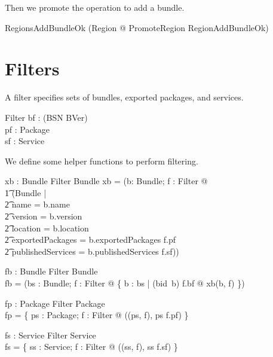 \documentclass[a4paper,9pt]{article}
\begin{document}
Then we promote the operation to add a bundle.
\begin{zed}
  RegionsAddBundleOk  (\exists \Delta Region @ PromoteRegion \land RegionAddBundleOk) \\
\end{zed}

\clearpage
\section{Filters}
\label{cha:filters}

A filter specifies sets of bundles, exported packages, and services.
\begin{schema}{Filter}
  bf : \power (BSN \cross BVer) \\
  pf : \power Package \\
  sf : \power Service \\
\end{schema}

We define some helper functions to perform filtering.
\begin{axdef}
  xb : Bundle \cross Filter \fun Bundle
\where
  xb = (\lambda b: Bundle; f : Filter @ \\
\t1  (\mu Bundle | \\
\t2 name = b.name \land \\
\t2 version = b.version \land \\
\t2 location = b.location \land \\
\t2 exportedPackages = b.exportedPackages \cap f.pf \land \\
\t2 publishedServices = b.publishedServices \cap f.sf))
\end{axdef}

\begin{axdef}
  fb : \power Bundle \cross Filter \fun \power Bundle \\
\where
  fb = (\lambda bs : \power Bundle; f : Filter @ \{ b : bs | (bid~b) \in f.bf @ xb(b, f) \}) \\
\end{axdef}

\begin{axdef}
  fp : \power Package \cross Filter \fun \power Package \\
\where
  fp = \{ ps : \power Package; f : Filter @ ((ps, f), ps \cap f.pf) \}
\end{axdef}

\begin{axdef}
  fs : \power Service \cross Filter \fun \power Service \\
\where
  fs = \{ ss : \power Service; f : Filter @ ((ss, f), ss \cap f.sf) \}
\end{axdef}
\end{document}
